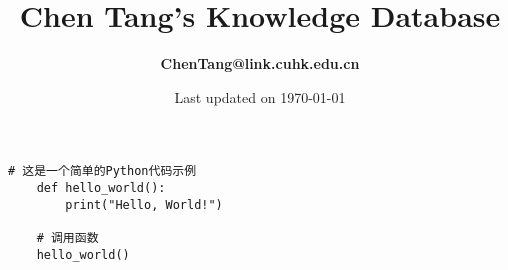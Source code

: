 \documentclass[12pt]{report}
\title{\textbf{Chen Tang's \break Knowledge Database}}
\author{\textbf{ChenTang@link.cuhk.edu.cn}}
\date{Last updated on \today}
\begin{document}
\maketitle

\clearpage
\begin{lstlisting}[caption={Your Python Code}, label={lst:python_code}]
    # 这是一个简单的Python代码示例
    def hello_world():
        print("Hello, World!")
    
    # 调用函数
    hello_world()
    \end{lstlisting}
\end{document}
